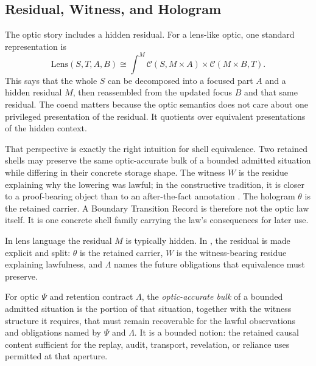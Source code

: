 \documentclass{aion}
\begin{document}
\subsection{Residual, Witness, and Hologram}
\label{subsec:residual-witness-hologram}

The optic story includes a hidden residual. For a lens-like optic, one standard
representation is \cite{Pickering2017,Boisseau2018}
\[
	\mathrm{Lens}(S,T,A,B)
	\cong
	\int^{M}
	\mathcal{C}(S, M \times A)
	\times
	\mathcal{C}(M \times B, T).
\]
This says that the whole \(S\) can be decomposed into a focused part \(A\) and
a hidden residual \(M\), then reassembled from the updated focus \(B\) and
that same residual. The coend matters because the optic semantics does not care
about one privileged presentation of the residual. It quotients over
equivalent presentations of the hidden context.

That perspective is exactly the right intuition for \WARP{} shell equivalence.
Two retained shells may preserve the same optic-accurate bulk of a bounded
admitted situation while differing in their concrete storage shape. The witness
\(W\) is the residue explaining why the lowering was lawful; in the constructive
tradition, it is closer to a proof-bearing object than to an after-the-fact
annotation \cite{MartinLof1984}. The hologram \(\theta\) is the retained carrier.
A Boundary Transition Record is therefore not the optic law itself. It is one
concrete shell family carrying the law's consequences for later use.

In lens language the residual \(M\) is typically hidden. In \WARP{}, the
residual is made explicit and split: \(\theta\) is the retained carrier, \(W\)
is the witness-bearing residue explaining lawfulness, and \(\Lambda\) names the
future obligations that equivalence must preserve.

		\begin{definition}
			\label{def:optic-accurate-bulk}
			For optic \(\Psi\) and retention contract \(\Lambda\), the
			\emph{optic-accurate bulk} of a bounded admitted situation is the portion of
		that situation, together with the witness structure it requires, that must
		remain recoverable for the lawful observations and obligations named by
		\(\Psi\) and \(\Lambda\). It is a bounded notion: the retained causal content
		sufficient for the replay, audit, transport, revelation, or reliance uses
		permitted at that aperture.
	\end{definition}
\end{document}
